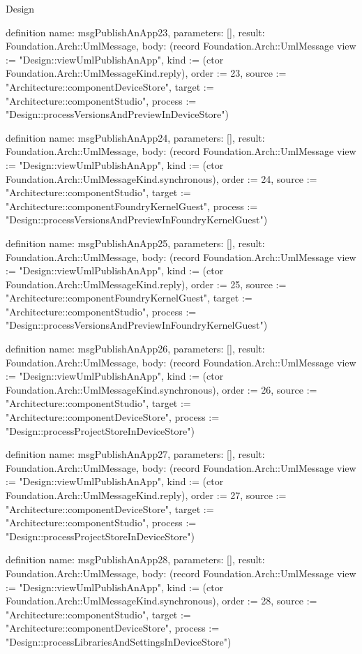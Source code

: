\begin{lexlean}{Design}
\begin{semanticmodule}
definition{
  name: msgPublishAnApp23,
  parameters: [],
  result: Foundation.Arch::UmlMessage,
  body: (record Foundation.Arch::UmlMessage {view := "Design::viewUmlPublishAnApp", kind := (ctor Foundation.Arch::UmlMessageKind.reply), order := 23, source := "Architecture::componentDeviceStore", target := "Architecture::componentStudio", process := "Design::processVersionsAndPreviewInDeviceStore"})
}

definition{
  name: msgPublishAnApp24,
  parameters: [],
  result: Foundation.Arch::UmlMessage,
  body: (record Foundation.Arch::UmlMessage {view := "Design::viewUmlPublishAnApp", kind := (ctor Foundation.Arch::UmlMessageKind.synchronous), order := 24, source := "Architecture::componentStudio", target := "Architecture::componentFoundryKernelGuest", process := "Design::processVersionsAndPreviewInFoundryKernelGuest"})
}

definition{
  name: msgPublishAnApp25,
  parameters: [],
  result: Foundation.Arch::UmlMessage,
  body: (record Foundation.Arch::UmlMessage {view := "Design::viewUmlPublishAnApp", kind := (ctor Foundation.Arch::UmlMessageKind.reply), order := 25, source := "Architecture::componentFoundryKernelGuest", target := "Architecture::componentStudio", process := "Design::processVersionsAndPreviewInFoundryKernelGuest"})
}

definition{
  name: msgPublishAnApp26,
  parameters: [],
  result: Foundation.Arch::UmlMessage,
  body: (record Foundation.Arch::UmlMessage {view := "Design::viewUmlPublishAnApp", kind := (ctor Foundation.Arch::UmlMessageKind.synchronous), order := 26, source := "Architecture::componentStudio", target := "Architecture::componentDeviceStore", process := "Design::processProjectStoreInDeviceStore"})
}

definition{
  name: msgPublishAnApp27,
  parameters: [],
  result: Foundation.Arch::UmlMessage,
  body: (record Foundation.Arch::UmlMessage {view := "Design::viewUmlPublishAnApp", kind := (ctor Foundation.Arch::UmlMessageKind.reply), order := 27, source := "Architecture::componentDeviceStore", target := "Architecture::componentStudio", process := "Design::processProjectStoreInDeviceStore"})
}

definition{
  name: msgPublishAnApp28,
  parameters: [],
  result: Foundation.Arch::UmlMessage,
  body: (record Foundation.Arch::UmlMessage {view := "Design::viewUmlPublishAnApp", kind := (ctor Foundation.Arch::UmlMessageKind.synchronous), order := 28, source := "Architecture::componentStudio", target := "Architecture::componentDeviceStore", process := "Design::processLibrariesAndSettingsInDeviceStore"})
}


\end{semanticmodule}
\end{lexlean}
